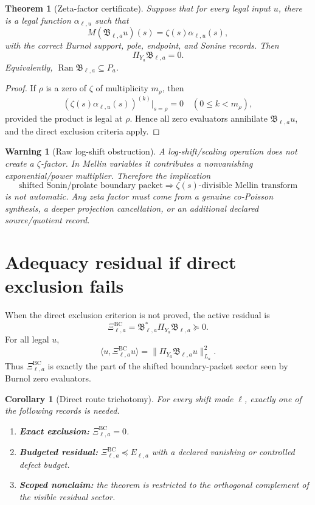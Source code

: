 \documentclass[11pt]{article}
\newtheorem{theorem}{Theorem}
\newtheorem{warning}{Warning}
\newtheorem{corollary}{Corollary}
\newcommand{\BC}{\mathrm{BC}}
\newcommand{\Ran}{\operatorname{Ran}}
\begin{document}
\begin{theorem}[Zeta-factor certificate]
Suppose that for every legal input \(u\), there is a legal function \(\alpha_{\ell,u}\) such that
\[
        M(\mathfrak B_{\ell,a}u)(s)=\zeta(s)\alpha_{\ell,u}(s),
\]
with the correct Burnol support, pole, endpoint, and Sonine records. Then
\[
        \Pi_{Y_a}\mathfrak B_{\ell,a}=0.
\]
Equivalently, \(\Ran\mathfrak B_{\ell,a}\subseteq P_a\).
\end{theorem}

\begin{proof}
If \(\rho\) is a zero of \(\zeta\) of multiplicity \(m_\rho\), then
\[
        \left(\zeta(s)\alpha_{\ell,u}(s)\right)^{(k)}\big|_{s=\rho}=0
        \quad (0\le k<m_\rho),
\]
provided the product is legal at \(\rho\). Hence all zero evaluators annihilate \(\mathfrak B_{\ell,a}u\), and the direct exclusion criteria apply.
\end{proof}

\begin{warning}[Raw log-shift obstruction]
A log-shift/scaling operation does not create a \(\zeta\)-factor. In Mellin variables it contributes a nonvanishing exponential/power multiplier. Therefore the implication
\[
        \text{shifted Sonin/prolate boundary packet}
        \Longrightarrow
        \zeta(s)\text{-divisible Mellin transform}
\]
is not automatic. Any zeta factor must come from a genuine co-Poisson synthesis, a deeper projection cancellation, or an additional declared source/quotient record.
\end{warning}

\section{Adequacy residual if direct exclusion fails}

When the direct exclusion criterion is not proved, the active residual is
\[
        \boxed{
        \Xi^{\BC}_{\ell,a}
        =\mathfrak B_{\ell,a}^{*}\Pi_{Y_a}\mathfrak B_{\ell,a}
        \succeq0.
        }
\]
For all legal \(u\),
\[
        \langle u,\Xi^{\BC}_{\ell,a}u\rangle
        =\|\Pi_{Y_a}\mathfrak B_{\ell,a}u\|_{L_a}^{2}.
\]
Thus \(\Xi^{\BC}_{\ell,a}\) is exactly the part of the shifted boundary-packet sector seen by Burnol zero evaluators.

\begin{corollary}[Direct route trichotomy]
For every shift mode \(\ell\), exactly one of the following records is needed.
\begin{enumerate}
\item \textbf{Exact exclusion:} \(\Xi^{\BC}_{\ell,a}=0\).
\item \textbf{Budgeted residual:} \(\Xi^{\BC}_{\ell,a}\preceq E_{\ell,a}\) with a declared vanishing or controlled defect budget.
\item \textbf{Scoped nonclaim:} the theorem is restricted to the orthogonal complement of the visible residual sector.
\end{enumerate}
\end{corollary}
\end{document}
